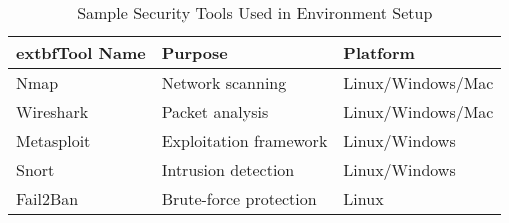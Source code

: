 \begin{table}[h!]
\centering
\begin{tabularx}{\textwidth}{|X|X|X|}
\hline
	extbf{Tool Name} & \textbf{Purpose} & \textbf{Platform} \\
\hline
Nmap & Network scanning & Linux/Windows/Mac \\
Wireshark & Packet analysis & Linux/Windows/Mac \\
Metasploit & Exploitation framework & Linux/Windows \\
Snort & Intrusion detection & Linux/Windows \\
Fail2Ban & Brute-force protection & Linux \\
\hline
\end{tabularx}
\caption{Sample Security Tools Used in Environment Setup}
\label{tab:envtools}
\end{table}
